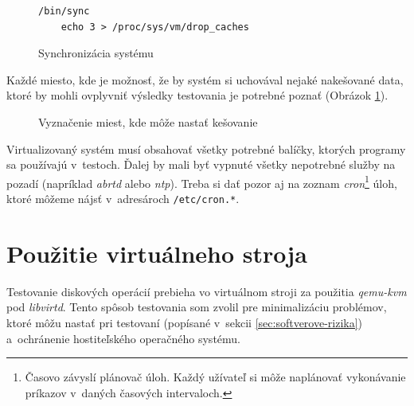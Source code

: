 \begin{figure}[H]
\begin{lstlisting}[label=alg:sync]
    /bin/sync
    echo 3 > /proc/sys/vm/drop_caches
\end{lstlisting}
\caption{Synchronizácia systému}
\end{figure}

Každé miesto, kde je možnosť, že by systém si uchovával nejaké nakešované data,
ktoré by mohli ovplyvniť výsledky testovania je potrebné poznať (Obrázok
\ref{graf-cache}).

\begin{figure}[H]
\begin{center}
  \caption{Vyznačenie miest, kde môže nastať kešovanie}
  \label{graf-cache}
\end{center}
\end{figure}

Virtualizovaný systém musí obsahovať všetky potrebné balíčky, ktorých programy
sa používajú v~testoch. Ďalej by mali byť vypnuté všetky nepotrebné služby na
pozadí (napríklad \emph{abrtd} alebo \emph{ntp}). Treba si dať pozor aj na
zoznam \emph{cron}\footnote{Časovo závyslí plánovač úloh. Každý užívateľ si
môže naplánovať vykonávanie príkazov v~daných časových intervaloch.} úloh,
ktoré môžeme nájsť v~adresároch \texttt{/etc/cron.*}.

%
%

\section{Použitie virtuálneho stroja}
\label{sec:virtual-machine}

Testovanie diskových operácií prebieha vo virtuálnom stroji za použitia
\emph{qemu-kvm} pod \emph{libvirtd}. Tento spôsob testovania som zvolil pre
minimalizáciu problémov, ktoré môžu nastať pri testovaní (popísané v~sekcii
\ref{sec:softverove-rizika}) a~ochránenie hostiteľského operačného systému.

